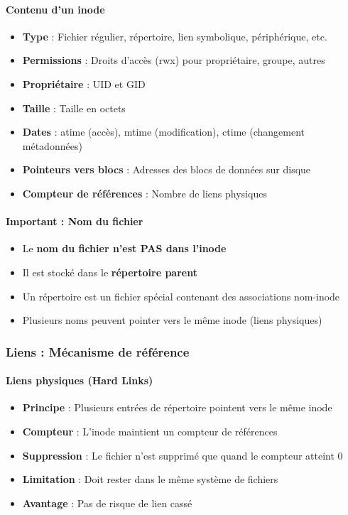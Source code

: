 \documentclass[12pt,a4paper]{article}
\begin{document}
\paragraph{Contenu d'un inode}
\begin{itemize}
    \item \textbf{Type} : Fichier régulier, répertoire, lien symbolique, périphérique, etc.
    \item \textbf{Permissions} : Droits d'accès (rwx) pour propriétaire, groupe, autres
    \item \textbf{Propriétaire} : UID et GID
    \item \textbf{Taille} : Taille en octets
    \item \textbf{Dates} : atime (accès), mtime (modification), ctime (changement métadonnées)
    \item \textbf{Pointeurs vers blocs} : Adresses des blocs de données sur disque
    \item \textbf{Compteur de références} : Nombre de liens physiques
\end{itemize}

\paragraph{Important : Nom du fichier}
\begin{itemize}
    \item Le \textbf{nom du fichier n'est PAS dans l'inode}
    \item Il est stocké dans le \textbf{répertoire parent}
    \item Un répertoire est un fichier spécial contenant des associations nom-inode
    \item Plusieurs noms peuvent pointer vers le même inode (liens physiques)
\end{itemize}

\subsubsection{Liens : Mécanisme de référence}

\paragraph{Liens physiques (Hard Links)}
\begin{itemize}
    \item \textbf{Principe} : Plusieurs entrées de répertoire pointent vers le même inode
    \item \textbf{Compteur} : L'inode maintient un compteur de références
    \item \textbf{Suppression} : Le fichier n'est supprimé que quand le compteur atteint 0
    \item \textbf{Limitation} : Doit rester dans le même système de fichiers
    \item \textbf{Avantage} : Pas de risque de lien cassé
\end{itemize}
\end{document}

